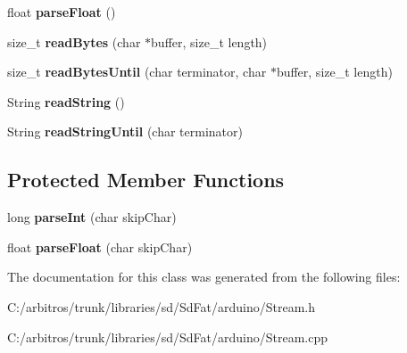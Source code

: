 \begin{DoxyCompactItemize}
\item 
\hypertarget{class_stream_a327a9ae2bfcaf84ddd69477839507ca7}{float {\bfseries parse\-Float} ()}\label{class_stream_a327a9ae2bfcaf84ddd69477839507ca7}

\item 
\hypertarget{class_stream_ada0b9486ea1fe7b8d4aab8f04f5607ee}{size\-\_\-t {\bfseries read\-Bytes} (char $\ast$buffer, size\-\_\-t length)}\label{class_stream_ada0b9486ea1fe7b8d4aab8f04f5607ee}

\item 
\hypertarget{class_stream_a9aa68dc2abab64ceafe8d8745b728af2}{size\-\_\-t {\bfseries read\-Bytes\-Until} (char terminator, char $\ast$buffer, size\-\_\-t length)}\label{class_stream_a9aa68dc2abab64ceafe8d8745b728af2}

\item 
\hypertarget{class_stream_ab1b0d4ef00718d18fe34d35dd1e26c66}{String {\bfseries read\-String} ()}\label{class_stream_ab1b0d4ef00718d18fe34d35dd1e26c66}

\item 
\hypertarget{class_stream_ac1f2b6e32ae2e321ad98c16482edf96a}{String {\bfseries read\-String\-Until} (char terminator)}\label{class_stream_ac1f2b6e32ae2e321ad98c16482edf96a}

\end{DoxyCompactItemize}
\subsection*{Protected Member Functions}
\begin{DoxyCompactItemize}
\item 
\hypertarget{class_stream_aa5269d83a12f784ac9d54e19104d39fe}{long {\bfseries parse\-Int} (char skip\-Char)}\label{class_stream_aa5269d83a12f784ac9d54e19104d39fe}

\item 
\hypertarget{class_stream_aa66300bfdb6b2eda158d84dbaf5adcb5}{float {\bfseries parse\-Float} (char skip\-Char)}\label{class_stream_aa66300bfdb6b2eda158d84dbaf5adcb5}

\end{DoxyCompactItemize}


The documentation for this class was generated from the following files\-:\begin{DoxyCompactItemize}
\item 
C\-:/arbitros/trunk/libraries/sd/\-Sd\-Fat/arduino/Stream.\-h\item 
C\-:/arbitros/trunk/libraries/sd/\-Sd\-Fat/arduino/Stream.\-cpp\end{DoxyCompactItemize}
